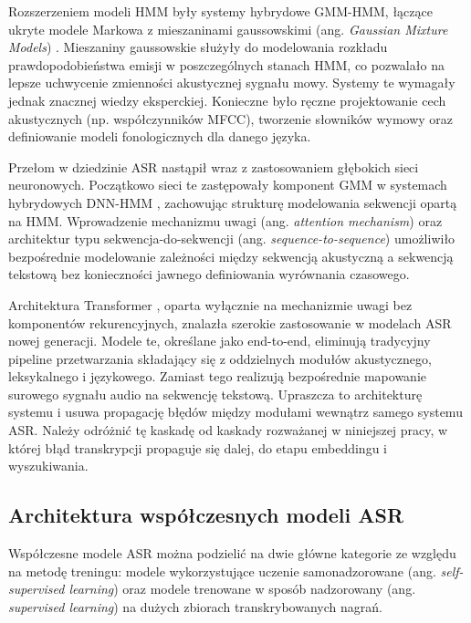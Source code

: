 Rozszerzeniem modeli HMM były systemy hybrydowe GMM-HMM, łączące ukryte modele Markowa z mieszaninami gaussowskimi (ang. \textit{Gaussian Mixture Models}) \cite{gales2008application}. Mieszaniny gaussowskie służyły do modelowania rozkładu prawdopodobieństwa emisji w poszczególnych stanach HMM, co pozwalało na lepsze uchwycenie zmienności akustycznej sygnału mowy. Systemy te wymagały jednak znacznej wiedzy eksperckiej. Konieczne było ręczne projektowanie cech akustycznych (np. współczynników MFCC), tworzenie słowników wymowy oraz definiowanie modeli fonologicznych dla danego języka.

Przełom w dziedzinie ASR nastąpił wraz z zastosowaniem głębokich sieci neuronowych. Początkowo sieci te zastępowały komponent GMM w systemach hybrydowych DNN-HMM \cite{hinton2012deep}, zachowując strukturę modelowania sekwencji opartą na HMM. Wprowadzenie mechanizmu uwagi (ang. \textit{attention mechanism}) \cite{bahdanau2014neural} oraz architektur typu sekwencja-do-sekwencji (ang. \textit{sequence-to-sequence}) \cite{sutskever2014sequence} umożliwiło bezpośrednie modelowanie zależności między sekwencją akustyczną a sekwencją tekstową bez konieczności jawnego definiowania wyrównania czasowego.

Architektura Transformer \cite{vaswani2017attention}, oparta wyłącznie na mechanizmie uwagi bez komponentów rekurencyjnych, znalazła szerokie zastosowanie w modelach ASR nowej generacji. Modele te, określane jako end-to-end, eliminują tradycyjny pipeline przetwarzania składający się z oddzielnych modułów akustycznego, leksykalnego i językowego. Zamiast tego realizują bezpośrednie mapowanie surowego sygnału audio na sekwencję tekstową. Upraszcza to architekturę systemu i usuwa propagację błędów między modułami wewnątrz samego systemu ASR. Należy odróżnić tę kaskadę od kaskady rozważanej w niniejszej pracy, w której błąd transkrypcji propaguje się dalej, do etapu embeddingu i wyszukiwania.

\subsection{Architektura współczesnych modeli ASR}

Współczesne modele ASR można podzielić na dwie główne kategorie ze względu na metodę treningu: modele wykorzystujące uczenie samonadzorowane (ang. \textit{self-supervised learning}) oraz modele trenowane w sposób nadzorowany (ang. \textit{supervised learning}) na dużych zbiorach transkrybowanych nagrań.


